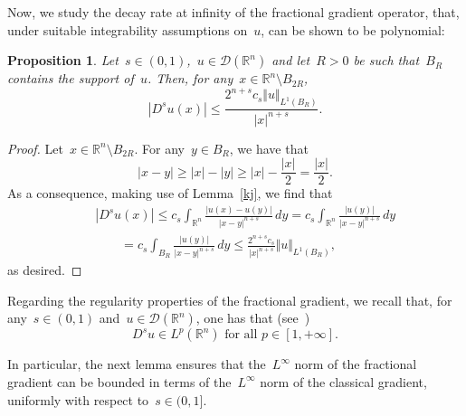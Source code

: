 \documentclass[11pt,hyp,]{nyjm}
\numberwithin{equation}{section}
\newcommand{\R}{\mathbb{R}}
\newtheorem{proposition}[theorem]{Proposition}
\theoremstyle{remark}
\newcommand{\Int}{\int_{\mathbb{R}^n}}
\renewcommand{\leq}{\leqslant}
\renewcommand{\ge}{\geqslant}
\begin{document}
			

		
Now, we study the decay rate at infinity of the fractional gradient operator, that, under suitable integrability assumptions on~$u$, can be shown to be polynomial:
			
			\begin{proposition}\label{usasempre}
				Let~$s\in (0,1)$,~$u \in \mathcal{D}(\R^n)$ and  let~$ R >0$ be such that~$B_{ R}$ contains the support of~$u$.			
				Then, for any~$x\in\R^n\setminus B_{ 2 R}$,
				\[  |D^s u (x)| \leq  \frac{  2^{n+s} c_s  \Vert u \Vert_{L^1\left(B_{ R}\right)}} {|x|^{n+s}} . \]
			\end{proposition}
			
			\begin{proof}
Let~$x \in \R^n \setminus B_{2  R}$. For any~$y \in B_{ R}$, we have that
				$$
					|x-y| \ge |x|-|y|\ge |x|-\frac{|x|}2= \frac{|x|}{2}. $$
				As a consequence,  making use of Lemma~\ref{kj}, we find that
				\begin{eqnarray*}
				&&	|D^s u (x)| \leq  c_s \Int \frac{|u(x)-u(y)|}{|x-y|^{n+s}} \, dy =  c_s \int_{\R^n} \frac{|u(y)|}{|x-y|^{n+s}} \, dy \\ &&\qquad=  c_s \int_{B_{ R}} \frac{|u(y)|}{|x-y|^{n+s}} \, dy \leq \frac{  2^{n+s} c_s} {|x|^{n+s}} \Vert u \Vert_{L^1\left(B_{ R}\right)},
			\end{eqnarray*} as desired.\end{proof}
			
			Regarding the regularity properties of the fractional gradient, we recall that, for any~$s \in (0,1)$
			and~$u \in \mathcal{D}(\R^n)$, one has that (see~\cite[Lemma~3.1]{piola})
			\begin{equation}\label{fracpiola}
				{\mbox{$D^s u \in L^p (\R^n)$ for all~$p \in [1, +\infty]$.}}
			\end{equation}
			
			In particular, the next lemma ensures that the~$L^{\infty}$ norm of the fractional gradient can be bounded in terms of the~$L^{\infty}$ norm of the classical gradient, uniformly with respect to~$s \in (0,1]$.
			
\end{document}
